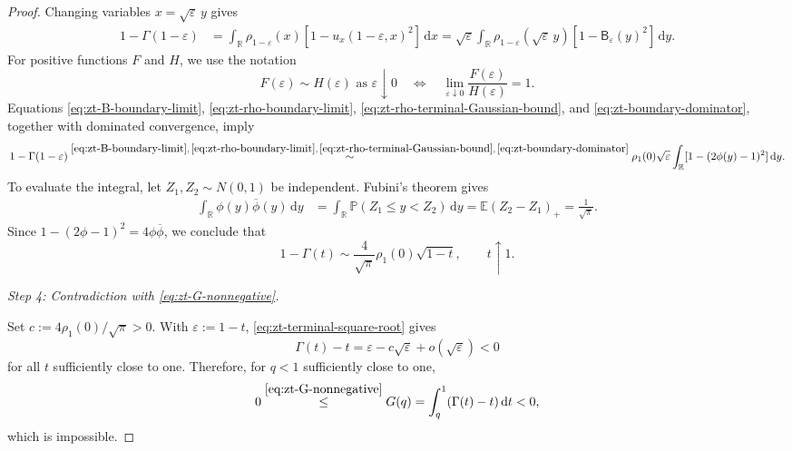 \documentclass[10pt]{amsart}
\theoremstyle{definition}
\theoremstyle{remark}
\numberwithin{equation}{section}
\newcommand{\R}{\mathbb R}
\newcommand{\E}{\mathbb E}
\newcommand{\PP}{\mathbb P}
\newcommand{\1}{\mathbf 1}
\newcommand{\dd}{\,\mathrm d}
\newcommand{\stackref}[2]{\stackrel{#2}{#1}}
\begin{document}
\begin{proof}
Changing variables $x=\sqrt\varepsilon\,y$ gives
\begin{align*}
 1-\Gamma(1-\varepsilon)
 &=\int_\R\rho_{1-\varepsilon}(x)
   [1-u_x(1-\varepsilon,x)^2]\dd x =\sqrt\varepsilon\int_\R
 \rho_{1-\varepsilon}(\sqrt\varepsilon\,y)
 [1-\mathsf B_\varepsilon(y)^2]\dd y.
\end{align*}
For positive functions $F$ and $H$, we use the notation
\begin{equation*}
 F(\varepsilon)\sim H(\varepsilon)\text{ as }\varepsilon\downarrow0
 \quad\Longleftrightarrow\quad
 \lim_{\varepsilon\downarrow0}\frac{F(\varepsilon)}{H(\varepsilon)}=1.
\end{equation*}
Equations \eqref{eq:zt-B-boundary-limit}, \eqref{eq:zt-rho-boundary-limit}, \eqref{eq:zt-rho-terminal-Gaussian-bound}, and \eqref{eq:zt-boundary-dominator}, together with dominated convergence, imply
\begin{equation*}
 1-\Gamma(1-\varepsilon)
 \stackref{\sim}{\eqref{eq:zt-B-boundary-limit},\,\eqref{eq:zt-rho-boundary-limit},\,\eqref{eq:zt-rho-terminal-Gaussian-bound},\,\eqref{eq:zt-boundary-dominator}}
 \rho_1(0)\sqrt\varepsilon
 \int_\R[1-(2\phi(y)-1)^2]\dd y.
\end{equation*}
To evaluate the integral, let $Z_1,Z_2\sim N(0,1)$ be independent. Fubini's theorem gives
\begin{align*}
 \int_\R\phi(y)\overline\phi(y)\dd y
 &=\int_\R\PP(Z_1\leq y<Z_2)\dd y =\E(Z_2-Z_1)_+=\frac1{\sqrt\pi}.
\end{align*}
Since $1-(2\phi-1)^2=4\phi\overline\phi$, we conclude that
\begin{equation}
 1-\Gamma(t)\sim\frac4{\sqrt\pi}\rho_1(0)\sqrt{1-t},
 \qquad t\uparrow1.
 \label{eq:zt-terminal-square-root}
\end{equation}

\smallskip
\noindent\emph{Step 4: Contradiction with \eqref{eq:zt-G-nonnegative}.}

Set $c:=4\rho_1(0)/\sqrt\pi>0$.  With $\varepsilon:=1-t$, \eqref{eq:zt-terminal-square-root} gives
\begin{equation*}
 \Gamma(t)-t=\varepsilon-c\sqrt\varepsilon
 +o(\sqrt\varepsilon)<0
\end{equation*}
for all $t$ sufficiently close to one.  Therefore, for $q<1$ sufficiently close to one,
\begin{equation*}
 0
 \stackref{\leq}{\eqref{eq:zt-G-nonnegative}}
 G(q)=\int_q^1(\Gamma(t)-t)\dd t<0,
\end{equation*}
which is impossible.
\end{proof}
\end{document}
